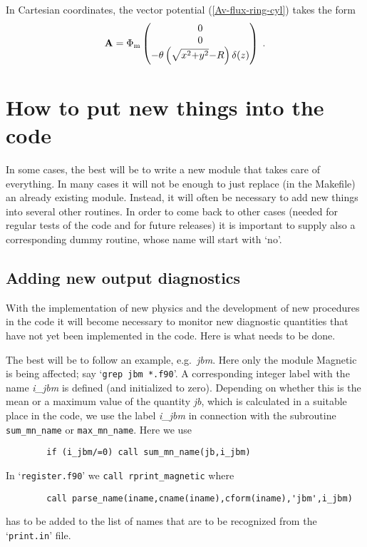 \documentclass[12pt,twoside,notitlepage,a4paper]{article}
\makeatletter
\newcommand{\code}[1]{\texttt{#1}}
\newcommand{\var}[1]{\textsl{#1}\index{#1@\emph{#1}}\/}
\newcommand{\file}[1]{`\texttt{#1}'}
\newcommand{\vekt}[1] {\mathbf{#1}}
\newcommand{\Av}            {\vekt{A}}
\newcommand{\Heavi}         {\theta}
\makeatother
\begin{document}
In Cartesian coordinates, the vector potential (\ref{Av-flux-ring-cyl})
takes the form
\begin{equation} \label{Av-flux-ring-cart}
  \Av =
  \Phi_{\rm m}
  \begin{pmatrix}
    0\\ 0\\ -\Heavi \left( \sqrt{x^2{+}y^2}{-}R \right) \delta(z)
  \end{pmatrix} \; .
\end{equation}



\section{How to put new things into the code}

In some cases, the best will be
to write a new module that takes care of everything.
In many cases it will not be enough to just replace (in the Makefile)
an already existing module. Instead, it will often be necessary to
add new things into several other routines. In order to come back
to other cases (needed for regular tests of the code and for future
releases) it is important to supply also a corresponding dummy routine,
whose name will start with `no'.

\subsection{Adding new output diagnostics}

With the implementation of new physics and the development of new procedures
in the code it will become necessary to monitor new diagnostic quantities that
have not yet been implemented in the code. Here is what needs to be done.

The best will be to follow an example, e.g.\ \var{jbm}. Here only the
module Magnetic is being affected; say \file{grep jbm *.f90}. A corresponding
integer label with the name \var{i\_jbm} is defined (and initialized to zero).
Depending on whether this is the mean or a maximum value of the quantity
\var{jb}, which is calculated in a suitable place in the code, we use the
label \var{i\_jbm} in connection with the subroutine \code{sum\_mn\_name} or
\code{max\_mn\_name}. Here we use
\begin{verbatim}
        if (i_jbm/=0) call sum_mn_name(jb,i_jbm)
\end{verbatim}
In \file{register.f90} we \code{call rprint\_magnetic} where 
\begin{verbatim}
        call parse_name(iname,cname(iname),cform(iname),'jbm',i_jbm)
\end{verbatim}
has to be added to the list of names that are to be recognized from the
\file{print.in} file.
\end{document}
